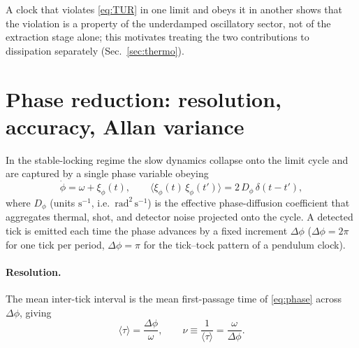 \documentclass[aps,pre,reprint,amsmath,amssymb,floatfix,nofootinbib]{revtex4-2}
\newcommand{\avg}[1]{\langle #1 \rangle}
\newcommand{\Dphi}{D_{\phi}}
\begin{document}
A clock that violates \eqref{eq:TUR} in one limit and obeys it in
another shows that the violation is a property of the underdamped
oscillatory sector, not of the extraction stage alone; this motivates
treating the two contributions to dissipation separately
(Sec.~\ref{sec:thermo}).

\section{Phase reduction: resolution, accuracy, Allan variance}
\label{sec:phase}

In the stable-locking regime the slow dynamics collapse onto the limit
cycle and are captured by a single phase variable obeying
\begin{equation}
  \dot{\phi} = \omega + \xi_\phi(t),
  \qquad
  \avg{\xi_\phi(t)\,\xi_\phi(t')} = 2\,\Dphi\,\delta(t-t'),
  \label{eq:phase}
\end{equation}
where $\Dphi$ (units $\mathrm{s}^{-1}$, i.e.\ $\mathrm{rad}^2\,\mathrm{s}^{-1}$)
is the effective phase-diffusion coefficient that aggregates thermal,
shot, and detector noise projected onto the cycle. A detected tick is
emitted each time the phase advances by a fixed increment $\Delta\phi$
($\Delta\phi = 2\pi$ for one tick per period, $\Delta\phi=\pi$ for the
tick--tock pattern of a pendulum clock).

\paragraph*{Resolution.}
The mean inter-tick interval is the mean first-passage time of
\eqref{eq:phase} across $\Delta\phi$, giving
\begin{equation}
  \avg{\tau} = \frac{\Delta\phi}{\omega},
  \qquad
  \nu \equiv \frac{1}{\avg{\tau}} = \frac{\omega}{\Delta\phi}.
  \label{eq:resolution}
\end{equation}
\end{document}
